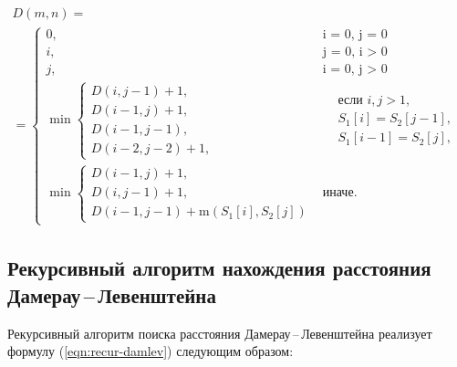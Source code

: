 \begin{multline}
    D(m, n) =\\ =
    \begin{cases}
        0, &\text{i = 0, j = 0}\\
        i, &\text{j = 0, i > 0}\\
        j, &\text{i = 0, j > 0}\\
        \min
        \begin{cases}
            D(i, j - 1) + 1,\\
            D(i - 1, j) + 1,\\
            D(i - 1, j - 1),\\
            D(i - 2, j - 2) + 1,
        \end{cases} 
        &\begin{aligned}
            & \text{если $i, j > 1$}, \\
            & S_{1}[i] = S_{2}[j - 1], \\
            & S_{1}[i - 1] = S_{2}[j],
        \end{aligned} \\
        \min
        \begin{cases}
            D(i - 1, j) + 1, \\
            D(i, j - 1) + 1, \\
            D(i - 1, j - 1) + \text{m}(S_1[i], S_2[j])
        \end{cases} &\text{иначе.}
    \end{cases}
    \label{eqn:recur-damlev}
\end{multline}


\subsection{\texorpdfstring{Рекурсивный алгоритм нахождения рассто\-яния Дамерау\,--\,Левенштейна}{}}

Рекурсивный алгоритм поиска расстояния Дамерау\,--\,Левенштейна реализует формулу (\ref{eqn:recur-damlev}) следующим образом:


